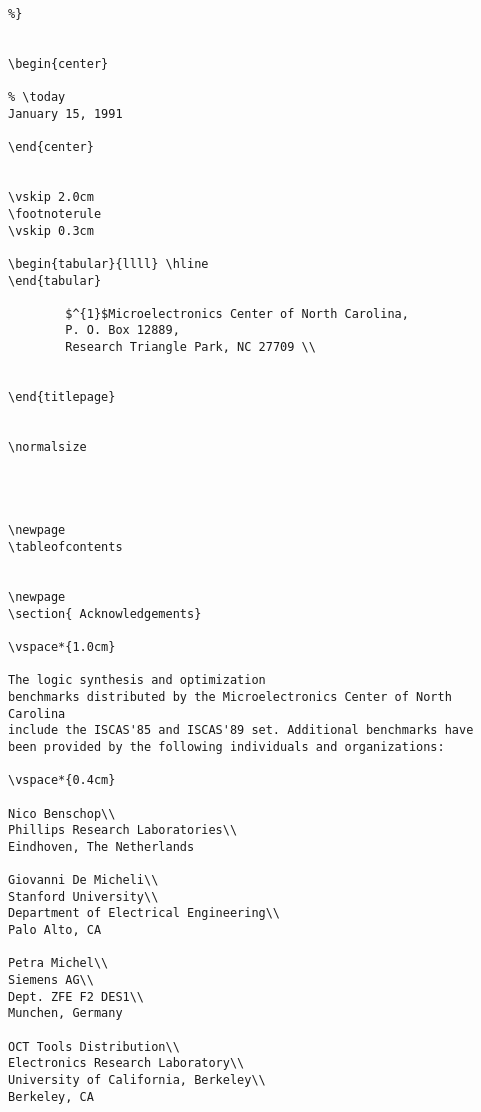 {\begin{pespace}
\begin{verbatim}
%}


\begin{center}

% \today
January 15, 1991

\end{center}


\vskip 2.0cm 
\footnoterule
\vskip 0.3cm 

\begin{tabular}{llll} \hline
\end{tabular}

        $^{1}$Microelectronics Center of North Carolina,
        P. O. Box 12889,
        Research Triangle Park, NC 27709 \\


\end{titlepage}


\normalsize




\newpage
\tableofcontents


\newpage
\section{ Acknowledgements}

\vspace*{1.0cm}

The logic synthesis and optimization
benchmarks distributed by the Microelectronics Center of North Carolina 
include the ISCAS'85 and ISCAS'89 set. Additional benchmarks have
been provided by the following individuals and organizations:

\vspace*{0.4cm}

Nico Benschop\\
Phillips Research Laboratories\\
Eindhoven, The Netherlands

Giovanni De Micheli\\
Stanford University\\
Department of Electrical Engineering\\
Palo Alto, CA

Petra Michel\\
Siemens AG\\
Dept. ZFE F2 DES1\\
Munchen, Germany

OCT Tools Distribution\\
Electronics Research Laboratory\\
University of California, Berkeley\\
Berkeley, CA


\end{verbatim}
\end{pespace}}
